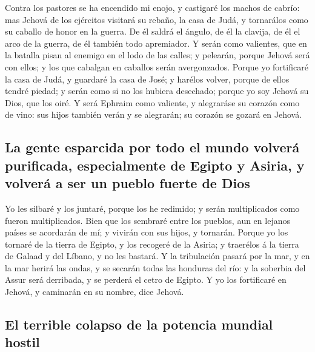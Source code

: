  Contra los pastores se ha encendido mi enojo, y castigaré
los machos de cabrío: mas Jehová de los ejércitos visitará su rebaño, la
casa de Judá, y tornarálos como su caballo de honor en la guerra.
 De él saldrá el ángulo, de él la clavija, de él el arco
de la guerra, de él también todo apremiador.  Y serán como
valientes, que en la batalla pisan al enemigo en el lodo de las calles;
y pelearán, porque Jehová será con ellos; y los que cabalgan en caballos
serán avergonzados.  Porque yo fortificaré la casa de
Judá, y guardaré la casa de José; y harélos volver, porque de ellos
tendré piedad; y serán como si no los hubiera desechado; porque yo soy
Jehová su Dios, que los oiré.  Y será Ephraim como
valiente, y alegraráse su corazón como de vino: sus hijos también verán
y se alegrarán; su corazón se gozará en Jehová.

\hypertarget{la-gente-esparcida-por-todo-el-mundo-volveruxe1-purificada-especialmente-de-egipto-y-asiria-y-volveruxe1-a-ser-un-pueblo-fuerte-de-dios}{%
\subsection{La gente esparcida por todo el mundo volverá purificada,
especialmente de Egipto y Asiria, y volverá a ser un pueblo fuerte de
Dios}\label{la-gente-esparcida-por-todo-el-mundo-volveruxe1-purificada-especialmente-de-egipto-y-asiria-y-volveruxe1-a-ser-un-pueblo-fuerte-de-dios}}

 Yo les silbaré y los juntaré, porque los he redimido; y
serán multiplicados como fueron multiplicados.  Bien que
los sembraré entre los pueblos, aun en lejanos países se acordarán de
mí; y vivirán con sus hijos, y tornarán.  Porque yo los
tornaré de la tierra de Egipto, y los recogeré de la Asiria; y traerélos
á la tierra de Galaad y del Líbano, y no les bastará.  Y
la tribulación pasará por la mar, y en la mar herirá las ondas, y se
secarán todas las honduras del río: y la soberbia del Assur será
derribada, y se perderá el cetro de Egipto.  Y yo los
fortificaré en Jehová, y caminarán en su nombre, dice Jehová.

\hypertarget{el-terrible-colapso-de-la-potencia-mundial-hostil}{%
\subsection{El terrible colapso de la potencia mundial
hostil}\label{el-terrible-colapso-de-la-potencia-mundial-hostil}}


